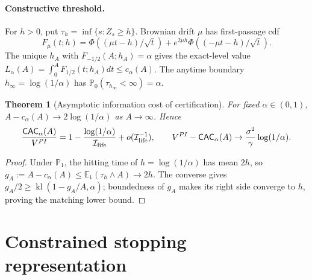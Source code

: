 \documentclass[11pt]{article}
\numberwithin{equation}{section}
\theoremstyle{plain}
\newtheorem{theorem}{Theorem}[section]
\theoremstyle{definition}
\theoremstyle{remark}
\newcommand{\Pzero}{\mathbb P_0}
\newcommand{\Pone}{\mathbb P_1}
\newcommand{\Eone}{\mathbb E_1}
\begin{document}
\paragraph{Constructive threshold.}\label{constructive-likelihood-threshold-lower-bound}
For $h>0$, put $\tau_h=\inf\{s:Z_s\ge h\}$. Brownian drift $\mu$ has first-passage cdf
\[
F_\mu(t;h)=\Phi((\mu t-h)/\sqrt t)+e^{2\mu h}\Phi((-\mu t-h)/\sqrt t).
\]
The unique $h_A$ with $F_{-1/2}(A;h_A)=\alpha$ gives the exact-level value $L_\alpha(A)=\int_0^A F_{1/2}(t;h_A)dt\le c_\alpha(A)$. The anytime boundary $h_\infty=\log(1/\alpha)$ has $\Pzero(\tau_{h_\infty}<\infty)=\alpha$.
\begin{theorem}[Asymptotic information cost of certification]
For fixed $\alpha\in(0,1)$, $A-c_\alpha(A)\to2\log(1/\alpha)$ as $A\to\infty$. Hence
\[
\frac{\mathsf{CAC}_\alpha(A)}{V^{PI}}
=1-\frac{\log(1/\alpha)}{\mathcal I_{\rm life}}+o(\mathcal I_{\rm life}^{-1}),
\qquad V^{PI}-\mathsf{CAC}_\alpha(A)\to\frac{\sigma^2}{\gamma}\log(1/\alpha).
\]
\end{theorem}
\begin{proof}
Under $\Pone$, the hitting time of $h=\log(1/\alpha)$ has mean $2h$, so $g_A:=A-c_\alpha(A)\le\Eone(\tau_h\wedge A)\to2h$. The converse gives $g_A/2\ge\operatorname{kl}(1-g_A/A,\alpha)$; boundedness of $g_A$ makes its right side converge to $h$, proving the matching lower bound.
\end{proof}

\section{Constrained stopping representation}\label{constrained-stopping-representation}
\end{document}
